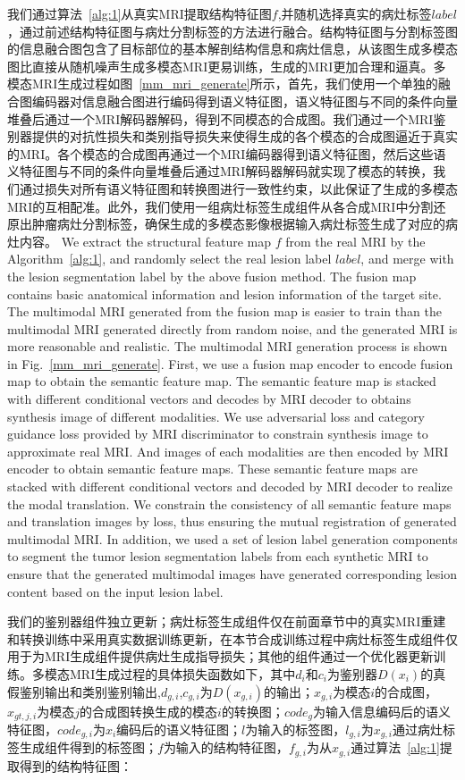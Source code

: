 \documentclass[letterpaper]{article} %
\begin{document}
我们通过算法~\ref{alg:1}从真实MRI提取结构特征图$f$,并随机选择真实的病灶标签$label$，通过前述结构特征图与病灶分割标签的方法进行融合。结构特征图与分割标签图的信息融合图包含了目标部位的基本解剖结构信息和病灶信息，从该图生成多模态图比直接从随机噪声生成多模态MRI更易训练，生成的MRI更加合理和逼真。多模态MRI生成过程如图~\ref{mm_mri_generate}所示，首先，我们使用一个单独的融合图编码器对信息融合图进行编码得到语义特征图，语义特征图与不同的条件向量堆叠后通过一个MRI解码器解码，得到不同模态的合成图。我们通过一个MRI鉴别器提供的对抗性损失和类别指导损失来使得生成的各个模态的合成图逼近于真实的MRI。各个模态的合成图再通过一个MRI编码器得到语义特征图，然后这些语义特征图与不同的条件向量堆叠后通过MRI解码器解码就实现了模态的转换，我们通过损失对所有语义特征图和转换图进行一致性约束，以此保证了生成的多模态MRI的互相配准。此外，我们使用一组病灶标签生成组件从各合成MRI中分割还原出肿瘤病灶分割标签，确保生成的多模态影像根据输入病灶标签生成了对应的病灶内容。
We extract the structural feature map $f$ from the real MRI by the Algorithm~\ref{alg:1}, and randomly select the real lesion label $label$, and merge with the lesion segmentation label by the above fusion method. The fusion map contains basic anatomical information and lesion information of the target site. The multimodal MRI generated from the fusion map is easier to train than the multimodal MRI generated directly from random noise, and the generated MRI is more reasonable and realistic. The multimodal MRI generation process is shown in Fig.~\ref{mm_mri_generate}. First, we use a fusion map encoder to encode fusion map to obtain the semantic feature map. The semantic feature map is stacked with different conditional vectors and decodes by MRI decoder to obtains synthesis image of different modalities. We use adversarial loss and category guidance loss provided by MRI discriminator to constrain synthesis image to approximate real MRI. And images of each modalities are then encoded by MRI encoder to obtain semantic feature maps. These semantic feature maps are stacked with different conditional vectors and decoded by MRI decoder to realize the modal translation. We constrain the consistency of all semantic feature maps and translation images by loss, thus ensuring the mutual registration of generated multimodal MRI. In addition, we used a set of lesion label generation components to segment the tumor lesion segmentation labels from each synthetic MRI to ensure that the generated multimodal images have generated corresponding lesion content based on the input lesion label.

我们的鉴别器组件独立更新；病灶标签生成组件仅在前面章节中的真实MRI重建和转换训练中采用真实数据训练更新，在本节合成训练过程中病灶标签生成组件仅用于为MRI生成组件提供病灶生成指导损失；其他的组件通过一个优化器更新训练。多模态MRI生成过程的具体损失函数如下，其中$d_{i}$和$c_{i}$为鉴别器$D(x_i)$的真假鉴别输出和类别鉴别输出,$d_{g,i}$,$c_{g,i}$为$D(x_{g,i})$的输出；$x_{g,i}$为模态$i$的合成图，$x_{gt,j,i}$为模态$j$的合成图转换生成的模态$i$的转换图；$code_g$为输入信息编码后的语义特征图，$code_{g,i}$为$x_i$编码后的语义特征图；$l$为输入的标签图，$l_{g,i}$为$x_{g,i}$通过病灶标签生成组件得到的标签图；$f$为输入的结构特征图，$f_{g,i}$为从$x_{g,i}$通过算法~\ref{alg:1}提取得到的结构特征图：
\end{document}
